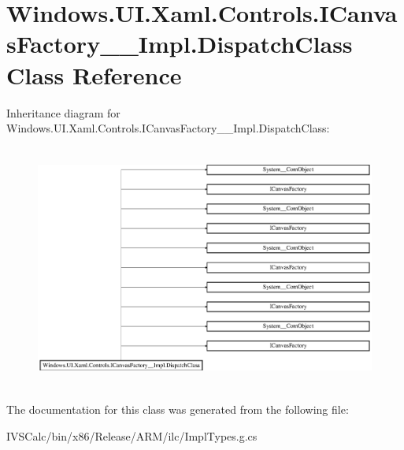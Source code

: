 \hypertarget{class_windows_1_1_u_i_1_1_xaml_1_1_controls_1_1_i_canvas_factory_____impl_1_1_dispatch_class}{}\section{Windows.\+U\+I.\+Xaml.\+Controls.\+I\+Canvas\+Factory\+\_\+\+\_\+\+Impl.\+Dispatch\+Class Class Reference}
\label{class_windows_1_1_u_i_1_1_xaml_1_1_controls_1_1_i_canvas_factory_____impl_1_1_dispatch_class}
Inheritance diagram for Windows.\+U\+I.\+Xaml.\+Controls.\+I\+Canvas\+Factory\+\_\+\+\_\+\+Impl.\+Dispatch\+Class\+:\begin{figure}[H]
\begin{center}
\leavevmode
\includegraphics[height=8.062827cm]{class_windows_1_1_u_i_1_1_xaml_1_1_controls_1_1_i_canvas_factory_____impl_1_1_dispatch_class}
\end{center}
\end{figure}


The documentation for this class was generated from the following file\+:\begin{DoxyCompactItemize}
\item 
I\+V\+S\+Calc/bin/x86/\+Release/\+A\+R\+M/ilc/Impl\+Types.\+g.\+cs\end{DoxyCompactItemize}
